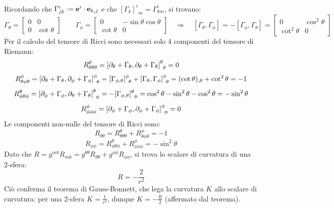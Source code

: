 Ricordando che $ \Gamma^i_{jk} \defeq \ve{e}^i \cdot \ve{e}_{k,j} $ e che $ [\Gamma_k]^i_{\,\,\,m} = \Gamma^i_{km} $, si trovano:
\begin{equation*}
	\Gamma_{\theta} =
	\begin{bmatrix}
		0 & 0 \\
		0 & \cot \theta
	\end{bmatrix}
	\qquad \Gamma_{\phi} =
	\begin{bmatrix}
		0 & - \sin \theta \cos \theta \\
		\cot \theta & 0
	\end{bmatrix}
	\quad\Longrightarrow\quad \left[ \Gamma_{\theta},\Gamma_{\phi} \right] = - \left[ \Gamma_{\phi},\Gamma_{\theta} \right] =
	\begin{bmatrix}
		0 & \cos^2 \theta \\
		\cot^2 \theta & 0
	\end{bmatrix}
\end{equation*}
Per il calcolo del tensore di Ricci sono necessari solo 4 componenti del tensore di Riemann:
\begin{equation*}
	R^{\theta}_{\theta\theta\theta} = \left[ \partial_{\theta} + \Gamma_{\theta}, \partial_{\theta} + \Gamma_{\theta} \right]^{\theta}_{\,\,\,\theta} = 0
\end{equation*}
\begin{equation*}
	R^{\phi}_{\theta\phi\theta} = \left[ \partial_{\theta} + \Gamma_{\theta}, \partial_{\phi} + \Gamma_{\phi} \right]^{\phi}_{\,\,\,\theta} = [\Gamma_{\phi,\theta}]^{\phi}_{\,\,\,\theta} + \left[ \Gamma_{\theta},\Gamma_{\phi} \right]^{\phi}_{\,\,\,\theta} = (\cot \theta)_{,\theta} + \cot^2 \theta = -1
\end{equation*}
\begin{equation*}
	R^{\theta}_{\phi\theta\phi} = \left[ \partial_{\phi} + \Gamma_{\phi}, \partial_\theta + \Gamma_{\theta} \right]^{\theta}_{\,\,\,\phi} = - [\Gamma_{\phi,\theta}]^{\theta}_{\,\,\,\phi} = \cos^2 \theta - \sin^2 \theta - \cos^2 \theta = - \sin^2 \theta
\end{equation*}
\begin{equation*}
	R^{\phi}_{\phi\phi\phi} = \left[ \partial_{\phi} + \Gamma_{\phi}, \partial_{\phi} + \Gamma_{\phi} \right]^{\phi}_{\,\,\,\phi} = 0
\end{equation*}
Le componenti non-nulle del tensore di Ricci sono:
\begin{equation*}
	R_{\theta\theta} = R^{\theta}_{\theta\theta\theta} + R^{\phi}_{\theta\phi\theta} = -1
\end{equation*}
\begin{equation*}
	R_{\phi\phi} = R^{\theta}_{\phi\theta\phi} + R^{\phi}_{\phi\phi\phi} = - \sin^2 \theta
\end{equation*}
Dato che $ R = g^{mk} R_{mk} = g^{\theta\theta} R_{\theta\theta} + g^{\phi\phi} R_{\phi\phi} $, si trova lo scalare di curvatura di una 2-sfera:
\begin{equation}
	R = - \frac{2}{r^2}
\end{equation}
Ciò conferma il teorema di Gauss-Bonnett, che lega la curvatura $ K $ allo scalare di curvatura: per una 2-sfera $ K = \frac{1}{r^2} $, dunque $ K = - \frac{R}{2} $ (affermato dal teorema).

